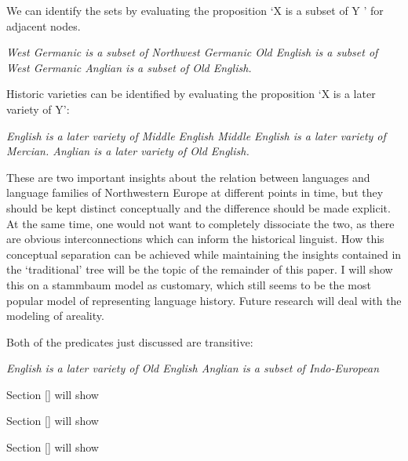 \documentclass[a4paper,10pt]{article}
\begin{document}
We can identify the sets by evaluating the proposition `X is a subset of Y ' for adjacent nodes.

\ea
\ea \em West Germanic \em is a subset of \em Northwest Germanic\em 
\ex *\em Old English \em is  a subset of \em West Germanic\em 
\ex *\em Anglian \em is a subset of \em Old English\em.\z
\z

Historic varieties can be identified by evaluating the proposition `X is a later variety of Y':

\ea
\ea \em English \em is a later variety of \em Middle English\em  
\ex *\em Middle English \em is  a later variety of  \em Mercian\em.  
\ex *\em Anglian \em is a later variety of \em Old English\em.\z
\z

These are two important insights about the relation between languages and language families of Northwestern Europe at different points in time, but they should be kept distinct conceptually and the difference should be made explicit. At the same time, one would not want to completely dissociate the two, as there are obvious interconnections which can inform the historical linguist. How this conceptual separation can be achieved while maintaining the insights contained in the `traditional' tree will be the topic of the remainder of this paper. I will show this on a stammbaum model as customary, which still seems to be the most popular model of representing language history. Future research will deal with the modeling of areality.



Both of the predicates just discussed are transitive:

\ea \em English \em is a later variety of \em Old English \em\z
\ea \em Anglian \em is a subset of \em Indo-European \em\z

Section \ref{} will show
 
Section \ref{} will show
 
Section \ref{} will show
 
\end{document}
